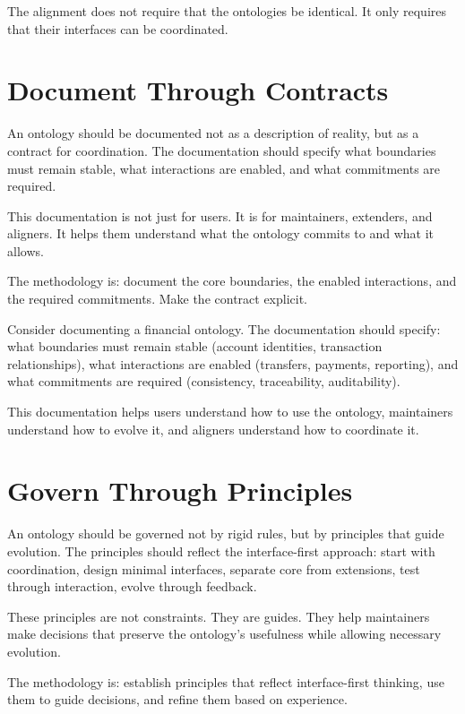\documentclass[
  openright]{book}
\begin{document}
The alignment does not require that the ontologies be identical. It only
requires that their interfaces can be coordinated.

\section{Document Through Contracts}\label{document-through-contracts}

An ontology should be documented not as a description of reality, but as
a contract for coordination. The documentation should specify what
boundaries must remain stable, what interactions are enabled, and what
commitments are required.

This documentation is not just for users. It is for maintainers,
extenders, and aligners. It helps them understand what the ontology
commits to and what it allows.

The methodology is: document the core boundaries, the enabled
interactions, and the required commitments. Make the contract explicit.

Consider documenting a financial ontology. The documentation should
specify: what boundaries must remain stable (account identities,
transaction relationships), what interactions are enabled (transfers,
payments, reporting), and what commitments are required (consistency,
traceability, auditability).

This documentation helps users understand how to use the ontology,
maintainers understand how to evolve it, and aligners understand how to
coordinate it.

\section{Govern Through Principles}\label{govern-through-principles}

An ontology should be governed not by rigid rules, but by principles
that guide evolution. The principles should reflect the interface-first
approach: start with coordination, design minimal interfaces, separate
core from extensions, test through interaction, evolve through feedback.

These principles are not constraints. They are guides. They help
maintainers make decisions that preserve the ontology's usefulness while
allowing necessary evolution.

The methodology is: establish principles that reflect interface-first
thinking, use them to guide decisions, and refine them based on
experience.
\end{document}
